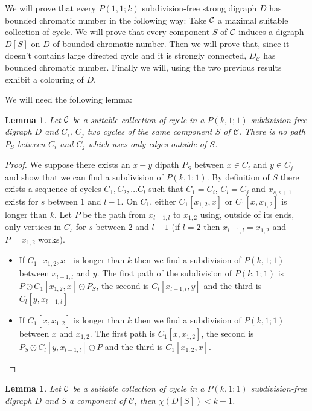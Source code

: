\documentclass[utf8,11pt]{article}
\theoremstyle{plain}
\newtheorem{lemma}[theorem]{Lemma}
\theoremstyle{definition}
\theoremstyle{remark}
\begin{document}
We will prove that every $P(1,1;k)$ subdivision-free strong digraph $D$ has bounded chromatic number in the following way:
Take ${\cal C}$ a maximal suitable collection of cycle. 
We will prove that every component $S$ of ${\cal C}$ induces a digraph $D[S]$ on $D$ of bounded chromatic number. 
Then we will prove that, since it doesn't contains large directed cycle and it is strongly connected, $D_{\mathcal{C}}$ has bounded chromatic number.
Finally we will, using the two previous results exhibit a colouring of $D$.

We will need the following lemma:

\begin{lemma}\label{lem:headphone}
Let ${\cal C}$ be a suitable collection of cycle in a $P(k,1;1)$ subdivision-free digraph $D$ and $C_i$, $C_j$ two cycles of the same
component $S$ of $\mathcal{C}$. There is no path $P_S$ between $C_i$ and $C_j$ which uses only edges outside of $S$.  
\end{lemma}

\begin{proof}
We suppose there exists an $x-y$ dipath $P_S$ between $x \in C_i$ and $y \in C_j$ and show that we can find a subdivision of $P(k,1;1)$. 
By definition of $S$ there exists a sequence of cycles $C_1, C_2, \dots C_l$ such that $C_1 = C_i$, $C_l = C_j$ and $x_{s,s+1}$ exists for $s$ between $1$ and $l-1$.
On $C_1$, either $C_1[x_{1,2}, x]$ or $C_1[x, x_{1,2}]$ is longer than $k$. 
Let $P$ be the path from $x_{l-1,l}$ to $x_{1,2}$ using, outside of its ends, only vertices in $C_s$ for $s$ between $2$ and $l-1$ (if $l = 2$ then
$x_{l-1,l} = x_{1,2}$ and $P = x_{1,2}$ works).
\begin{itemize}
	\item If $C_1[x_{1,2}, x]$ is longer than $k$ then we find a subdivision of $P(k,1;1)$ between $x_{l-1,l}$ and $y$. 
	The first path of the subdivision of $P(k,1;1)$ is $P \odot C_1[x_{1,2}, x] \odot P_S$, the second is 
	$C_l[x_{l-1,l}, y]$ and the third is $C_l[ y, x_{l-1,l}]$
	\item If $C_1[x, x_{1,2}]$ is longer than $k$ then we find a subdivision of $P(k,1;1)$ between $x$ and $x_{1,2}$.
	The first path is $C_1[x, x_{1,2}]$, the second is $P_S \odot C_l[y, x_{l-1,l}] \odot P$ and the third is $C_1[x_{1,2}, x]$. 
\end{itemize}
\end{proof}

 
\begin{lemma}\label{lem:compo1}
Let ${\cal C}$ be a suitable collection of cycle in a $P(k,1;1)$ subdivision-free digraph $D$ and $S$ a component of $\mathcal{C}$, then $\chi(D[S]) < k+1$.	 
\end{lemma}
\end{document}
